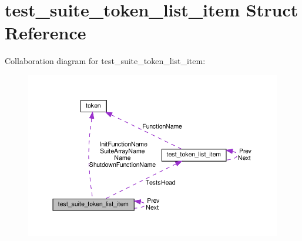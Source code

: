 \hypertarget{structtest__suite__token__list__item}{}\section{test\+\_\+suite\+\_\+token\+\_\+list\+\_\+item Struct Reference}
\label{structtest__suite__token__list__item}


Collaboration diagram for test\+\_\+suite\+\_\+token\+\_\+list\+\_\+item\+:
\nopagebreak
\begin{figure}[H]
\begin{center}
\leavevmode
\includegraphics[width=350pt]{da/d06/structtest__suite__token__list__item__coll__graph}
\end{center}
\end{figure}
